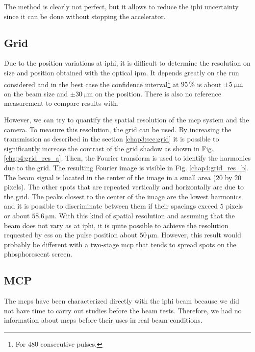 \begin{refsection}
  The method is clearly not perfect, but it allows to reduce the \acrshort{iphi} uncertainty since it can be done without stopping the accelerator.

  \subsection{Grid}

  Due to the position variations at \acrshort{iphi}, it is difficult to determine the resolution on size and position obtained with the optical \acrshort{ipm}. It depends greatly on the run considered and in the best case the confidence interval\footnote{For 480 consecutive pulses.} at $95\,\mathrm{\%}$ is about $\pm 5\,\mathrm{\mu m}$ on the beam size and $\pm 30\,\mathrm{\mu m}$ on the position. There is also no reference measurement to compare results with.

  However, we can try to quantify the spatial resolution of the \acrshort{mcp} system and the camera.
  To measure this resolution, the grid can be used. By increasing the transmission as described in the section \ref{chap3:sec:grid} it is possible to significantly increase the contrast of the grid shadow as shown in Fig. \ref{chap4:grid_res_a}. Then, the Fourier transform is used to identify the harmonics due to the grid. The resulting Fourier image is visible in Fig. \ref{chap4:grid_res_b}. The beam signal is located in the center of the image in a small area ($20$ by $20$ pixels). The other spots that are repeated vertically and horizontally are due to the grid. The peaks closest to the center of the image are the lowest harmonics and it is possible to discriminate between them if their spacings exceed $5$ pixels or about $58.6\,\mathrm{\mu m}$. With this kind of spatial resolution and assuming that the beam does not vary as at \acrshort{iphi}, it is quite possible to achieve the resolution requested by \acrshort{ess} on the pulse position about $50\,\mathrm{\mu m}$. However, this result would probably be different with a two-stage \acrshort{mcp} that tends to spread spots on the phosphorescent screen.

  

  \subsection{MCP}
  The \acrshort{mcp}s have been characterized directly with the \acrshort{iphi} beam because we did not have time to carry out studies before the beam tests. Therefore, we had no information about \acrshort{mcp}s before their uses in real beam conditions.


\end{refsection}
